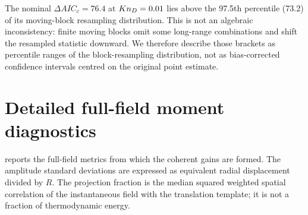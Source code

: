 The nominal $\Delta AIC_c=76.4$ at $Kn_D=0.01$ lies above the 97.5th percentile (73.2) of its moving-block resampling distribution. This is not an algebraic inconsistency: finite moving blocks omit some long-range combinations and shift the resampled statistic downward. We therefore describe those brackets as percentile ranges of the block-resampling distribution, not as bias-corrected confidence intervals centred on the original point estimate.

\section{Detailed full-field moment diagnostics}
 reports the full-field metrics from which the coherent gains are formed. The amplitude standard deviations are expressed as equivalent radial displacement divided by $R$. The projection fraction is the median squared weighted spatial correlation of the instantaneous field with the translation template; it is not a fraction of thermodynamic energy.

